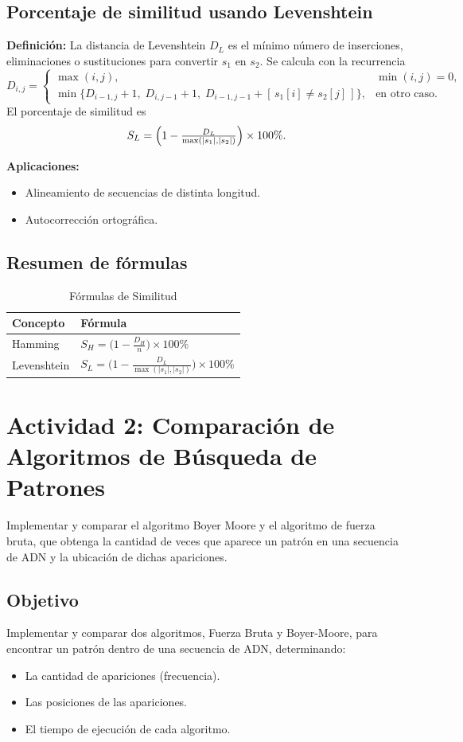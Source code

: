 \documentclass[fleqn,10pt]{article}
\begin{document}
\subsection{Porcentaje de similitud usando Levenshtein}
\textbf{Definición:}
La distancia de Levenshtein \(D_L\) es el mínimo número de inserciones, eliminaciones o sustituciones para convertir \(s_1\) en \(s_2\). Se calcula con la recurrencia
\[
D_{i,j}=
\begin{cases}
\max(i,j), & \min(i,j)=0,\\[6pt]
\min\bigl\{
    D_{i-1,j}+1,\;
    D_{i,j-1}+1,\;
    D_{i-1,j-1} + [\,s_1[i]\neq s_2[j]\,]
\bigr\}, & \text{en otro caso.}
\end{cases}
\]
El porcentaje de similitud es
\[
S_L = \Bigl(1 - \tfrac{D_L}{\max(|s_1|,|s_2|)}\Bigr)\times 100\%.
\]

\textbf{Aplicaciones:}
\begin{itemize}
    \item Alineamiento de secuencias de distinta longitud.
    \item Autocorrección ortográfica.
\end{itemize}

\subsection{Resumen de fórmulas}
\begin{table}[h!]
    \centering
    \caption{Fórmulas de Similitud}
    \begin{tabular}{ll}
        \toprule
        Concepto     & Fórmula \\ \midrule
        Hamming      & \(S_H = \displaystyle\bigl(1-\tfrac{D_H}{n}\bigr)\times100\%\) \\
        Levenshtein  & \(S_L = \displaystyle\bigl(1-\tfrac{D_L}{\max(|s_1|,|s_2|)}\bigr)\times100\%\) \\ \bottomrule
    \end{tabular}
\end{table}

\section{Actividad 2: Comparación de Algoritmos de Búsqueda de Patrones}
Implementar y comparar el algoritmo Boyer Moore y el algoritmo de fuerza bruta, que obtenga la cantidad de veces que aparece un patrón en una secuencia de ADN y la ubicación de dichas apariciones.

\subsection{Objetivo}
Implementar y comparar dos algoritmos, Fuerza Bruta y Boyer-Moore, para encontrar un patrón dentro de una secuencia de ADN, determinando:
\begin{itemize}
    \item La cantidad de apariciones (frecuencia).
    \item Las posiciones de las apariciones.
    \item El tiempo de ejecución de cada algoritmo.
\end{itemize}
\end{document}
